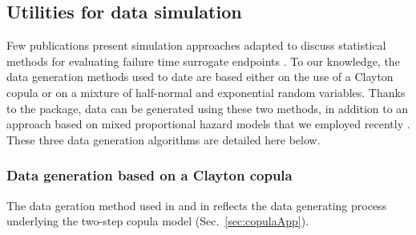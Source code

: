 \documentclass[]{scrartcl}\usepackage[]{graphicx}\usepackage[]{color}
\begin{document}
{{\subsection{Utilities for data simulation}
Few publications present simulation approaches adapted to discuss
  statistical methods for evaluating failure time surrogate endpoints
  \cite{BurzykowskiCortinas05, ShiEtal11, RenfroEtal12, Renfro2014, Renfro2015}.
To our knowledge, the data generation methods used to date are based
  either on the use of a Clayton copula or on a mixture of half-normal and
  exponential random variables.
Thanks to the  package,
  data can be generated using these two methods, 
  in addition to an approach based
  on mixed proportional hazard models that we employed recently
  \citep{RotoloPoissurogate}.
These three data generation algorithms are detailed here below.

\subsubsection{Data generation based on a Clayton copula}
The data geration method used in \cite{BurzykowskiCortinas05}
  and in \cite{Renfro2014, Renfro2015} reflects the data generating process 
  underlying the two-step copula model (Sec.~\ref{sec:copulaApp}).

}}
\end{document}
